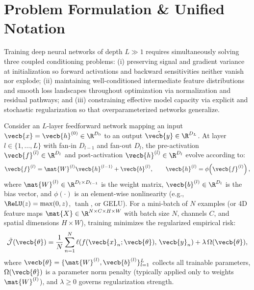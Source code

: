\documentclass[../../../../master.tex]{subfiles}
\begin{document}

\section{Problem Formulation \& Unified Notation}
\label{sec:normres:formulation}

Training deep neural networks of depth $L \gg 1$ requires simultaneously solving three coupled conditioning problems: (i) preserving signal and gradient variance at initialization so forward activations and backward sensitivities neither vanish nor explode; (ii) maintaining well-conditioned intermediate feature distributions and smooth loss landscapes throughout optimization via normalization and residual pathways; and (iii) constraining effective model capacity via explicit and stochastic regularization so that overparameterized networks generalize.

Consider an $L$-layer feedforward network mapping an input $\vecb{x} = \vecb{h}^{(0)} \in \R^{D_0}$ to an output $\hat{\vecb{y}} \in \R^{D_L}$. At layer $l \in \{1, \dots, L\}$ with fan-in $D_{l-1}$ and fan-out $D_l$, the pre-activation $\vecb{f}^{(l)} \in \R^{D_l}$ and post-activation $\vecb{h}^{(l)} \in \R^{D_l}$ evolve according to:
\begin{equation}
  \vecb{f}^{(l)} = \mat{W}^{(l)} \vecb{h}^{(l-1)} + \vecb{b}^{(l)}, \qquad
  \vecb{h}^{(l)} = \phi\!\left(\vecb{f}^{(l)}\right),
  \label{eq:normres:ffn_layer}
\end{equation}
where $\mat{W}^{(l)} \in \R^{D_l \times D_{l-1}}$ is the weight matrix, $\vecb{b}^{(l)} \in \R^{D_l}$ is the bias vector, and $\phi(\cdot)$ is an element-wise nonlinearity (e.g., $\ReLU(z) = \max(0, z)$, $\tanh$, or GELU). For a mini-batch of $N$ examples (or 4D feature maps $\mat{X} \in \R^{N \times C \times H \times W}$ with batch size $N$, channels $C$, and spatial dimensions $H \times W$), training minimizes the regularized empirical risk:
\begin{equation}
  \tilde{\mathcal{J}}(\vecb{\theta}) = \frac{1}{N}\sum_{n=1}^{N} \ell\!\left(f(\vecb{x}_n; \vecb{\theta}),\, \vecb{y}_n\right) + \lambda\,\Omega(\vecb{\theta}),
  \label{eq:normres:reg_objective}
\end{equation}
where $\vecb{\theta} = \{\mat{W}^{(l)}, \vecb{b}^{(l)}\}_{l=1}^L$ collects all trainable parameters, $\Omega(\vecb{\theta})$ is a parameter norm penalty (typically applied only to weights $\mat{W}^{(l)}$), and $\lambda \ge 0$ governs regularization strength.
\end{document}
